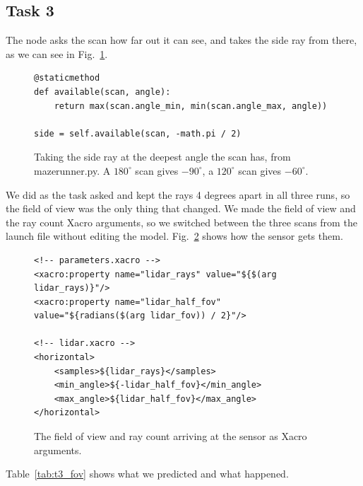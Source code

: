 \documentclass[conference]{IEEEtran}
\begin{document}
\subsection{Task 3}


The node asks the scan how far out it can see, and takes the side ray from
there, as we can see in Fig.~\ref{lst:t3_side}.

\begin{figure}[H]
\begin{verbatim}
@staticmethod
def available(scan, angle):
    return max(scan.angle_min, min(scan.angle_max, angle))

side = self.available(scan, -math.pi / 2)
\end{verbatim}
\caption{Taking the side ray at the deepest angle the scan has, from
         mazerunner.py. A $180^\circ$ scan gives $-90^\circ$, a $120^\circ$
         scan gives $-60^\circ$.}
\label{lst:t3_side}
\end{figure}

We did as the task asked and kept the rays 4 degrees apart in all three runs,
so the field of view was the only thing that changed. We made the field of
view and the ray count Xacro arguments, so we switched between the three scans
from the launch file without editing the model.
Fig.~\ref{lst:t3_xacro} shows how the sensor gets them.

\begin{figure}[H]
\begin{verbatim}
<!-- parameters.xacro -->
<xacro:property name="lidar_rays" value="${$(arg lidar_rays)}"/>
<xacro:property name="lidar_half_fov" value="${radians($(arg lidar_fov)) / 2}"/>

<!-- lidar.xacro -->
<horizontal>
    <samples>${lidar_rays}</samples>
    <min_angle>${-lidar_half_fov}</min_angle>
    <max_angle>${lidar_half_fov}</max_angle>
</horizontal>
\end{verbatim}
\caption{The field of view and ray count arriving at the sensor as Xacro
         arguments.}
\label{lst:t3_xacro}
\end{figure}

Table~\ref{tab:t3_fov} shows what we predicted and what happened.
\end{document}
